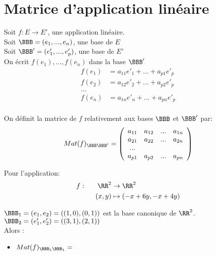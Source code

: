 \documentclass[../main.tex]{subfile}
\begin{document}
\section{Matrice d'application linéaire}

Soit $f : E \to E'$, une application linéaire.\\
Soit $\BBB = (e_1, ..., e_n)$, une base de $E$\\
Soit $\BBB' = (e_1', ..., e_p')$, une base de $E'$\\

On écrit $f(e_1), ..., f(e_n)$ dans la base $\BBB'$\\

$$
\begin{aligned}
	f(e_1) &= a_{11}e'_1 + ... + a_{p1}e'_p\\
	f(e_2) &= a_{12}e'_2 + ... + a_{p2}e'_p\\
	...\\
	f(e_n) &= a_{1n}e'_n + ... + a_{pn}e'_p\\
\end{aligned}
$$

On définit la matrice de $f$ relativement aux bases $\BBB$ et $\BBB'$ par:
$$
Mat(f)_{\BBB\BBB'} =
\left(
\begin{array}{cccc}
	a_{11} & a_{12} & ... & a_{1n}\\
	a_{21} & a_{22} & ... & a_{2n}\\
	...\\
	a_{p1} & a_{p2} & ... & a_{pn}\\
\end{array}
\right)
$$

\begin{ex}
	Pour l'application:
	$$
\begin{aligned}
	f :\phantom{......} \RR^2 &\to \RR^2\\
	 (x,y) &\mapsto (-x+6y , -x+4y)
\end{aligned}
	$$

	$\BBB_1 = (e_1, e_2) = ((1, 0), (0, 1))$ est la base canonique de $\RR^2$.\\
	$\BBB_2 = (e'_1, e'_2) = ((3, 1), (2, 1))$\\

	Alors :\\
\begin{itemize}	
	\item $Mat(f)_{\BBB_1\BBB_1} = $
\end{itemize}
\end{ex}
\end{document}

